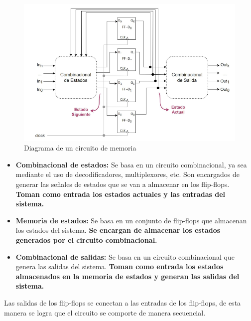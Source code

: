 \begin{figure}[h]
    \centering
    \includegraphics[scale=0.8]{img/sec.png}
    \caption{Diagrama de un circuito de memoria}
\end{figure}
\begin{itemize}
    \item \textbf{Combinacional de estados:} Se basa en un circuito combinacional, ya sea mediante el uso de decodificadores, multiplexores, etc. Son encargados de generar las señales de estados que se van a almacenar en los flip-flops. \textbf{Toman como entrada los estados actuales y las entradas del sistema.}
    \item \textbf{Memoria de estados:} Se basa en un conjunto de flip-flops que almacenan los estados del sistema. \textbf{Se encargan de almacenar los estados generados por el circuito combinacional.}
    \item \textbf{Combinacional de salidas:} Se basa en un circuito combinacional que genera las salidas del sistema. \textbf{Toman como entrada los estados almacenados en la memoria de estados y generan las salidas del sistema.}
\end{itemize}

Las salidas de los flip-flops se conectan a las entradas de los flip-flops, de esta manera se logra que el circuito se comporte de manera secuencial.
